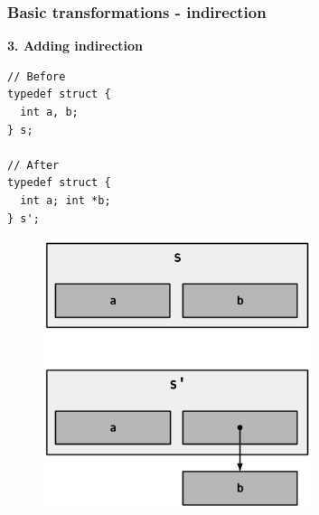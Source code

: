 \begin{frame}[fragile]
\frametitle{Basic transformations - indirection}

\begin{center}
\begin{minipage}{0.3\linewidth}
\textbf{\small 3. Adding indirection}
\begin{lstlisting}[style=Cstyle, basicstyle=\scriptsize]
// Before
typedef struct {
  int a, b;
} s;

// After
typedef struct {
  int a; int *b;
} s';
\end{lstlisting}
\end{minipage}%
\begin{minipage}{0.5\linewidth}
\begin{figure}
	\centering
	\includegraphics[width=0.7\textwidth]{images/indirection}
\end{figure}
\end{minipage}
\end{center}

\end{frame}


